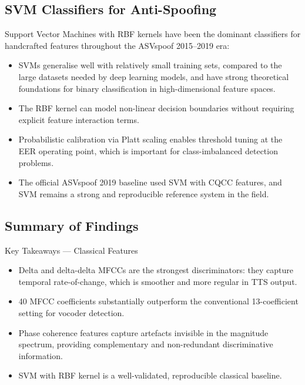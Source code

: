 \documentclass[12pt,a4paper]{article}
\begin{document}
\subsection{SVM Classifiers for Anti-Spoofing}

Support Vector Machines with RBF kernels have been the dominant classifiers for
handcrafted features throughout the ASVspoof 2015--2019 era:

\begin{itemize}
  \item SVMs generalise well with relatively small training sets, compared to the large
    datasets needed by deep learning models, and have strong theoretical foundations for
    binary classification in high-dimensional feature spaces.
  \item The RBF kernel can model non-linear decision boundaries without requiring explicit
    feature interaction terms.
  \item Probabilistic calibration via Platt scaling enables threshold tuning at the EER
    operating point, which is important for class-imbalanced detection problems.
  \item The official ASVspoof 2019 baseline used SVM with CQCC features, and SVM remains
    a strong and reproducible reference system in the field.
\end{itemize}

\subsection{Summary of Findings}

\begin{keybox}{Key Takeaways --- Classical Features}
  \begin{itemize}
    \item Delta and delta-delta MFCCs are the strongest discriminators: they capture
      temporal rate-of-change, which is smoother and more regular in TTS output.
    \item 40 MFCC coefficients substantially outperform the conventional 13-coefficient
      setting for vocoder detection.
    \item Phase coherence features capture artefacts invisible in the magnitude spectrum,
      providing complementary and non-redundant discriminative information.
    \item SVM with RBF kernel is a well-validated, reproducible classical baseline.
  \end{itemize}
\end{keybox}
\end{document}
